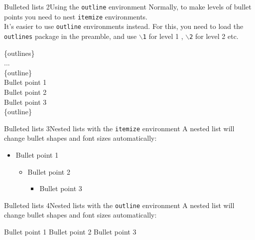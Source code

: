 \documentclass[aspectratio=169]{beamer}
\begin{document}
\begin{frame}{Bulleted lists 2}{Using the {\tt outline} environment}
	Normally, to make levels of bullet points you need to nest {\tt itemize} environments. \\

	It's easier to use {\tt outline} environments instead. For this, you need to load the {\tt outlines} package in the preamble, and use {\tt $\backslash$1} for level 1 , {\tt $\backslash$2} for level 2 etc. \\
	\vspace{0.2cm}
	\begin{codesnippet}
		\{outlines\} \\
		... \\
		\{outline\} \\
		\ind \ind {} Bullet point 1 \\
		\ind \ind {} Bullet point 2 \\
		\ind \ind {} Bullet point 3 \\
		\{outline\}
	\end{codesnippet}
\end{frame}

\begin{frame}{Bulleted lists 3}{Nested lists with the {\tt itemize} environment}
	A nested list will change bullet shapes and font sizes automatically:
	\begin{itemize}
		\item Bullet point 1
		      \begin{itemize}
			      \item Bullet point 2
			            \begin{itemize}
				            \item Bullet point 3
			            \end{itemize}
		      \end{itemize}
	\end{itemize}
\end{frame}

\begin{frame}{Bulleted lists 4}{Nested lists with the {\tt outline} environment}
	A nested list will change bullet shapes and font sizes automatically:
	\begin{outline}
		\1 Bullet point 1
		\2 Bullet point 2
		\3 Bullet point 3
	\end{outline}
\end{frame}
\end{document}
